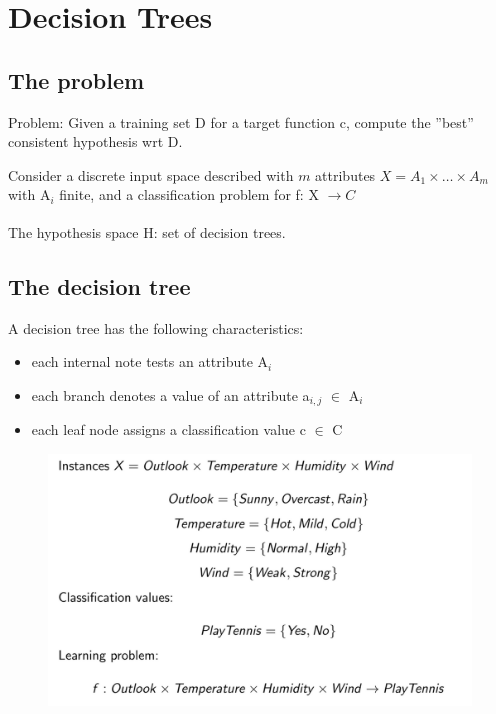 \section{Decision Trees}\label{DecisionTrees} %

\subsection{The problem}
Problem: Given a training set D for a target function c, compute the ”best” consistent hypothesis wrt D.


Consider a discrete input space described with $m$ attributes $X = A_1 \times \dots \times A_m$ with A$_{i}$ finite, and a classification problem for f: X $\xrightarrow[]{} C$

The hypothesis space H: set of decision trees.

\subsection{The decision tree}

A decision tree has the following characteristics:
\begin{itemize}
    \item each internal note tests an attribute A$_{i}$ 
    \item each branch denotes a value of an attribute a$_{i,j}$  $\in$ A$_{i}$ 
    \item each leaf node assigns a classification value c $\in$ C
\end{itemize}


\begin{figure}[H]
    \centering
    \includegraphics[width=12cm]{images/Decision Trees/Screenshot_20221004_141401.png}
    \caption{}
    \label{fig:image2.1}
\end{figure}


